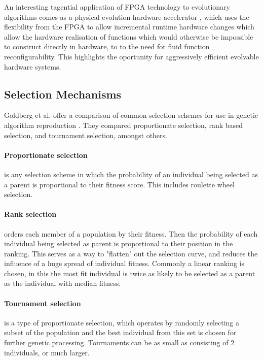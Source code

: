 An interesting tagential application of FPGA technology to evolutionary algorithms comes as
a physical evolution hardware accelerator \cite{1377261}, which uses the flexibility from the
FPGA to allow incremental runtime hardware changes which allow the hardware realisation of
functions which would otherwise be impossible to construct directly in hardware, to to the
need for fluid function reconfigurability.
This highlights the oportunity for aggressively efficient evolvable hardware
systems.

\subsection{Selection Mechanisms}

Goldberg et al. offer a comparison of common selection schemes for use in genetic
algorithm reproduction \cite{GOLDBERG199169}. They compared proportionate
selection, rank based selection, and tournament selection, amongst others.

\paragraph{Proportionate selection} is any selection scheme in which the probability
of an individual being selected as a parent is proportional to their fitness score.
This includes roulette wheel selection.

\paragraph{Rank selection} orders each member of a population by their
fitness. Then the probability of each individual being selected as
parent is proportional to their position in the ranking. This serves as
a way to "flatten" out the selection curve, and reduces the influence of
a huge spread of individual fitness. Commonly a linear ranking is chosen,
in this the most fit individual is twice as likely to be selected
as a parent as the individual with median fitness.

\paragraph{Tournament selection} is a type of proportionate selection,
which operates by randomly selecting a subset of the
population and the best individual from this set is chosen for further genetic
processing. Tournaments can be as small as consisting of 2 individuals, or much
larger.

